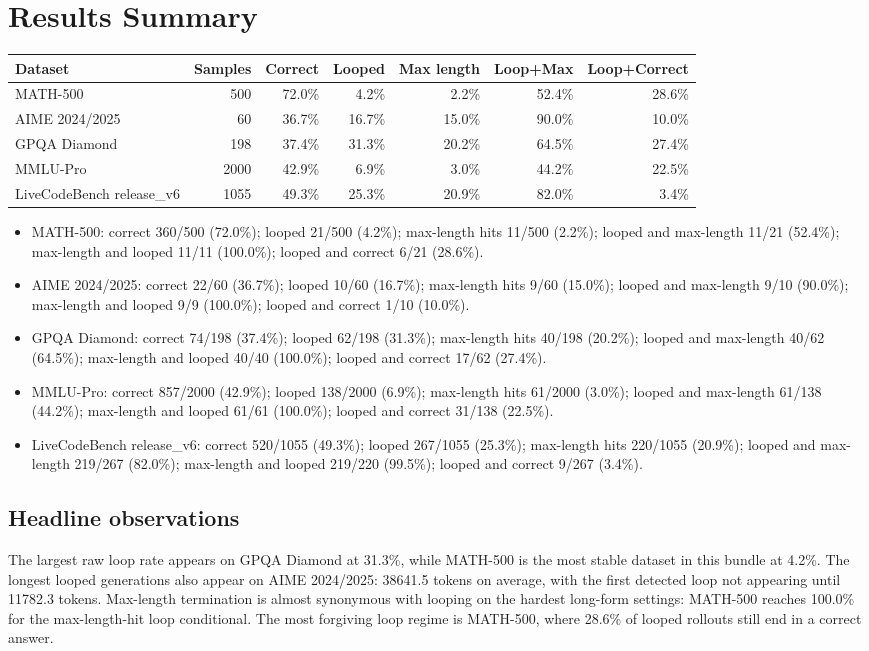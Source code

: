 \documentclass[11pt]{article}
\begin{document}
\section*{Results Summary}
\begin{tabular}{lrrrrrr}
\toprule
Dataset & Samples & Correct & Looped & Max length & Loop+Max & Loop+Correct \\
\midrule
MATH-500 & 500 & 72.0\% & 4.2\% & 2.2\% & 52.4\% & 28.6\% \\
AIME 2024/2025 & 60 & 36.7\% & 16.7\% & 15.0\% & 90.0\% & 10.0\% \\
GPQA Diamond & 198 & 37.4\% & 31.3\% & 20.2\% & 64.5\% & 27.4\% \\
MMLU-Pro & 2000 & 42.9\% & 6.9\% & 3.0\% & 44.2\% & 22.5\% \\
LiveCodeBench release\_v6 & 1055 & 49.3\% & 25.3\% & 20.9\% & 82.0\% & 3.4\% \\
\bottomrule
\end{tabular}

\begin{itemize}[leftmargin=1.5em]
\item MATH-500: correct 360/500 (72.0\%); looped 21/500 (4.2\%); max-length hits 11/500 (2.2\%); looped and max-length 11/21 (52.4\%); max-length and looped 11/11 (100.0\%); looped and correct 6/21 (28.6\%).
\item AIME 2024/2025: correct 22/60 (36.7\%); looped 10/60 (16.7\%); max-length hits 9/60 (15.0\%); looped and max-length 9/10 (90.0\%); max-length and looped 9/9 (100.0\%); looped and correct 1/10 (10.0\%).
\item GPQA Diamond: correct 74/198 (37.4\%); looped 62/198 (31.3\%); max-length hits 40/198 (20.2\%); looped and max-length 40/62 (64.5\%); max-length and looped 40/40 (100.0\%); looped and correct 17/62 (27.4\%).
\item MMLU-Pro: correct 857/2000 (42.9\%); looped 138/2000 (6.9\%); max-length hits 61/2000 (3.0\%); looped and max-length 61/138 (44.2\%); max-length and looped 61/61 (100.0\%); looped and correct 31/138 (22.5\%).
\item LiveCodeBench release\_v6: correct 520/1055 (49.3\%); looped 267/1055 (25.3\%); max-length hits 220/1055 (20.9\%); looped and max-length 219/267 (82.0\%); max-length and looped 219/220 (99.5\%); looped and correct 9/267 (3.4\%).
\end{itemize}

\subsection*{Headline observations}
The largest raw loop rate appears on GPQA Diamond at 31.3\%, while MATH-500 is the most stable dataset in this bundle at 4.2\%.
The longest looped generations also appear on AIME 2024/2025: 38641.5 tokens on average, with the first detected loop not appearing until 11782.3 tokens.
Max-length termination is almost synonymous with looping on the hardest long-form settings: MATH-500 reaches 100.0\% for the max-length-hit loop conditional.
The most forgiving loop regime is MATH-500, where 28.6\% of looped rollouts still end in a correct answer.
\end{document}
